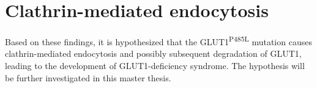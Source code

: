\section{Clathrin-mediated endocytosis}
Based on these findings, it is hypothesized that the GLUT1\textsuperscript{P485L} mutation causes clathrin-mediated endocytosis and possibly subsequent degradation of GLUT1, leading to the development of GLUT1-deficiency syndrome. The hypothesis will be further investigated in this master thesis.

\newcommand{\keyword}[1]{\textbf{#1}}
\newcommand{\tabhead}[1]{\textbf{#1}}
\newcommand{\code}[1]{\texttt{#1}}
\newcommand{\file}[1]{\texttt{\bfseries#1}}
\newcommand{\option}[1]{\texttt{\itshape#1}}


